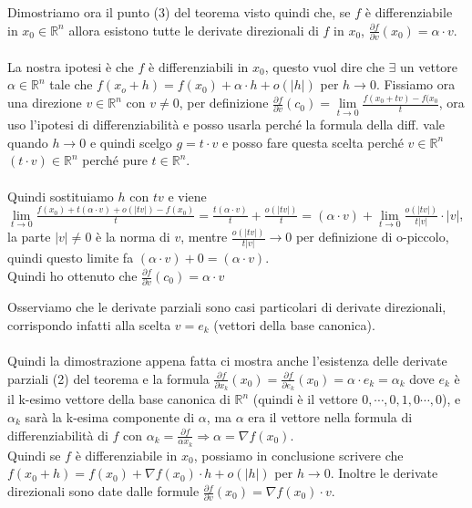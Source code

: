 \begin{demostration}
Dimostriamo ora il punto (3) del teorema visto quindi che, se $f$ è differenziabile in $x_0 \in \mathbb{R}^n$ allora esistono tutte le derivate direzionali di $f$ in $x_0$, $\frac{\partial f}{\partial v}(x_0) = \alpha \cdot v$.\\\\
La nostra ipotesi è che $f$ è differenziabili in $x_0$, questo vuol dire che $\exists$ un vettore $\alpha \in \mathbb{R}^n$ tale che $f(x_o + h) = f(x_0) + \alpha \cdot h + o(|h|)$ per $h\to 0$. Fissiamo ora una direzione $v \in \mathbb{R}^n$ con $v\neq 0$, per definizione $\frac{\partial f}{\partial v}(c_0) = \lim\limits_{t\to 0}\frac{f(x_0 + tv) - f(x_0}{t}$, ora uso l'ipotesi di differenziabilità e posso usarla perché la formula della diff. vale quando $h\to 0$ e quindi scelgo $g = t \cdot v$ e posso fare questa scelta perché $v \in \mathbb{R}^n$  $(t\cdot v)\in \mathbb{R}^n$ perché pure $t \in \mathbb{R}^n$.\\\\
Quindi sostituiamo $h$ con $tv$ e viene $\lim\limits_{t\to 0}\frac{f(x_0) + t(\alpha \cdot v) + o(|tv|) - f(x_0)}{t} = \frac{t(\alpha\cdot v)}{t} + \frac{o(|tv|)}{t} = (\alpha \cdot v) + \lim\limits_{t\to 0}\frac{o(|tv|)}{t|v|} \cdot |v|$, la parte $|v| \neq 0$ è la norma di $v$, mentre $\frac{o(|tv|)}{t|v|}\to 0$ per definizione di o-piccolo, quindi questo limite fa $(\alpha \cdot v) + 0 = (\alpha \cdot v)$.\\
Quindi ho ottenuto che $\frac{\partial f}{\partial v}(c_0) = \alpha \cdot v$
\end{demostration}

\begin{observation}
Osserviamo che le derivate parziali sono casi particolari di derivate direzionali, corrispondo infatti alla scelta $v = e_k$ (vettori della base canonica).\\\\ Quindi la dimostrazione appena fatta ci mostra anche l'esistenza delle derivate parziali (2) del teorema e la formula $\frac{\partial f}{\partial x_k}(x_0) = \frac{\partial f}{\partial e_k}(x_0) = \alpha \cdot e_k = \alpha_k$ dove $e_k$ è il k-esimo vettore della base canonica di $\mathbb{R}^n$ (quindi è il vettore $0,\cdots,0, 1, 0 \cdots, 0$), e $\alpha_k$ sarà la k-esima componente di $\alpha$, ma $\alpha$ era il vettore nella formula di differenziabilità di $f$ con $\alpha_k = \frac{\partial f}{\alpha x_k} \Longrightarrow \alpha = \nabla f(x_0)$. \\
Quindi se $f$ è differenziabile in $x_0$, possiamo in conclusione scrivere che $f(x_0 + h) = f(x_0) + \nabla f(x_0) \cdot h + o(|h|)$ per $h\to 0$.
Inoltre le derivate direzionali sono date dalle formule $\frac{\partial f}{\partial v}(x_0) = \nabla f(x_0)\cdot v$.
\end{observation}

